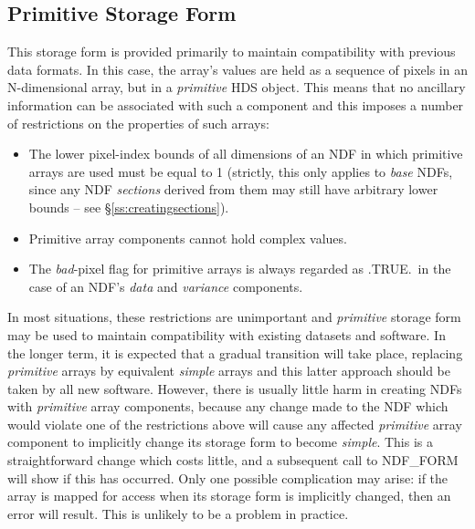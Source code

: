 \documentclass[twoside,11pt]{article}
\newcommand{\htmlref}[2]{#1}
\newcommand{\xref}[3]{#1}
\newcommand{\xlabel}[1]{}
\newcommand{\st}[1]{{\em{#1}}}
\begin{document}
\subsection{\xlabel{primitive_storage_form}\label{ss:implicitformchange}\label{ss:primitiveform}Primitive Storage Form}

This storage form is provided primarily to maintain compatibility with
previous data formats. 
In this case, the array's values are held as a sequence of pixels in an
N-dimensional array, but in a \st{primitive\/} \xref{HDS
object}{sun92}{HDS_objects}.
This means that no ancillary information can be associated with such a
component and this imposes a number of restrictions on the properties of
such arrays: 

\begin{itemize}

\item
The lower pixel-index bounds of all dimensions of an NDF in which primitive
arrays are used must be equal to 1 (strictly, this only applies to \st{base\/} NDFs, since any NDF \st{sections\/} derived from them may still have
arbitrary lower bounds -- see \S\ref{ss:creatingsections}). 

\item
Primitive array components cannot hold complex values.

\item
The \st{bad\/}-pixel flag for primitive arrays is always regarded as
.TRUE.\ in the case of an NDF's \st{data\/} and \st{variance\/}
components.

\end{itemize}

In most situations, these restrictions are unimportant and \st{primitive\/}
storage form may be used to maintain compatibility with existing datasets
and software. 
In the longer term, it is expected that a gradual transition will take
place, replacing \st{primitive\/} arrays by equivalent \st{simple\/} arrays
and this latter approach should be taken by all new software.
However, there is usually little harm in creating NDFs with
\st{primitive\/} array components, because any change made to the NDF
which 
would violate one of the restrictions above will cause any affected
\st{primitive\/} array component to implicitly change its storage form
to become 
\st{simple}. 
This is a straightforward change which costs little, and a subsequent call
to \htmlref{NDF\_FORM}{NDF_FORM} will show if this has occurred. 
Only one possible complication may arise: if the array is mapped for access
when its storage form is implicitly changed, then an error will result. 
This is unlikely to be a problem in practice.
\end{document}

